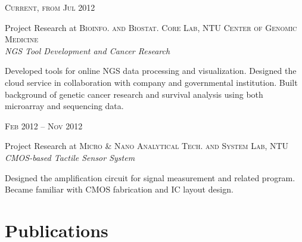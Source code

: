 \documentclass[10pt, a4paper]{article} %
\begin{document}
{\begin{minipage}[t]{0.5\textwidth}

{\raggedleft\textsc{Current, from Jul 2012}\par}

{\raggedright\large Project Research at \textsc{Bioinfo. and Biostat. Core Lab, NTU Center of Genomic Medicine}\\
\textit{NGS Tool Development and Cancer Research}\\[5pt]}

\normalsize{Developed tools for online NGS data processing and visualization. Designed the cloud service in collaboration with company and governmental institution. Built background of genetic cancer research and survival analysis using both microarray and sequencing data.}\\


{\raggedleft\textsc{Feb 2012 -- Nov 2012}\par}

{\raggedright\large Project Research at \textsc{Micro \& Nano Analytical Tech. and System Lab, NTU}\\
\textit{CMOS-based Tactile Sensor System}\\[5pt]}

\normalsize{Designed the amplification circuit for signal measurement and related program. Became familiar with CMOS fabrication and IC layout design.}\\[10pt]


\section{Publications}


\end{minipage}}
\end{document}
